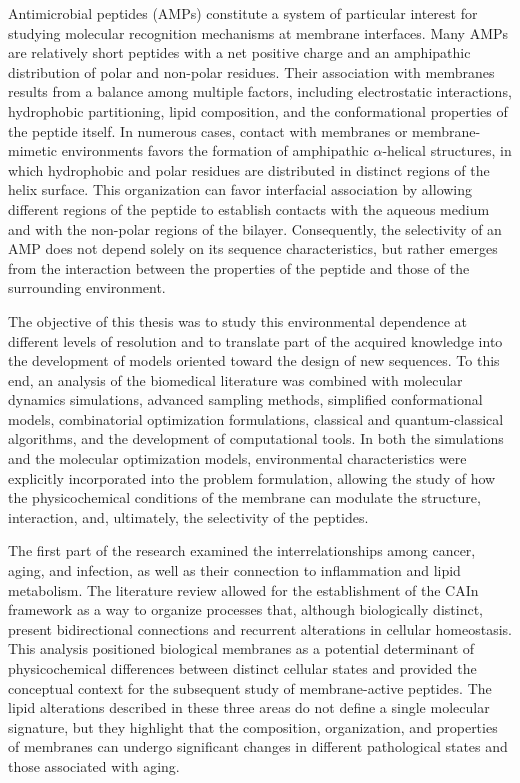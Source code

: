 Antimicrobial peptides (AMPs) constitute a system of particular interest for studying molecular recognition mechanisms at membrane interfaces. Many AMPs are relatively short peptides with a net positive charge and an amphipathic distribution of polar and non-polar residues. Their association with membranes results from a balance among multiple factors, including electrostatic interactions, hydrophobic partitioning, lipid composition, and the conformational properties of the peptide itself. In numerous cases, contact with membranes or membrane-mimetic environments favors the formation of amphipathic $\alpha$-helical structures, in which hydrophobic and polar residues are distributed in distinct regions of the helix surface. This organization can favor interfacial association by allowing different regions of the peptide to establish contacts with the aqueous medium and with the non-polar regions of the bilayer. Consequently, the selectivity of an AMP does not depend solely on its sequence characteristics, but rather emerges from the interaction between the properties of the peptide and those of the surrounding environment.

The objective of this thesis was to study this environmental dependence at different levels of resolution and to translate part of the acquired knowledge into the development of models oriented toward the design of new sequences. To this end, an analysis of the biomedical literature was combined with molecular dynamics simulations, advanced sampling methods, simplified conformational models, combinatorial optimization formulations, classical and quantum-classical algorithms, and the development of computational tools. In both the simulations and the molecular optimization models, environmental characteristics were explicitly incorporated into the problem formulation, allowing the study of how the physicochemical conditions of the membrane can modulate the structure, interaction, and, ultimately, the selectivity of the peptides.

The first part of the research examined the interrelationships among cancer, aging, and infection, as well as their connection to inflammation and lipid metabolism. The literature review allowed for the establishment of the CAIn framework as a way to organize processes that, although biologically distinct, present bidirectional connections and recurrent alterations in cellular homeostasis. This analysis positioned biological membranes as a potential determinant of physicochemical differences between distinct cellular states and provided the conceptual context for the subsequent study of membrane-active peptides. The lipid alterations described in these three areas do not define a single molecular signature, but they highlight that the composition, organization, and properties of membranes can undergo significant changes in different pathological states and those associated with aging.

